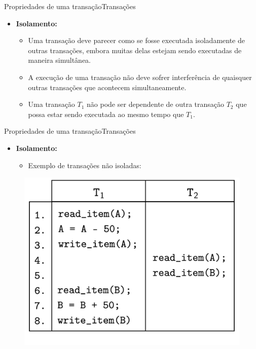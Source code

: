 \documentclass[t]{beamer}
\begin{document}

\begin{ftst}{Propriedades de uma transação}{Transações}

\begin{itemize}
    \item \textbf{Isolamento:} 
    \vone
    \begin{itemize}
        \item Uma transação deve parecer como se fosse executada isoladamente de outras transações, embora muitas delas estejam sendo executadas de maneira simultânea.
        \item A execução de uma transação não deve sofrer interferência de quaisquer outras transações que acontecem simultaneamente.
        \item Uma transação $T_1$ não pode ser dependente de outra transação $T_2$ que possa estar sendo executada ao mesmo tempo que $T_1$.
    \end{itemize}
\end{itemize}

\end{ftst}


\begin{ftst}{Propriedades de uma transação}{Transações}

\begin{itemize}
    \item \textbf{Isolamento:} 
    \vone
    \begin{itemize}
        \item Exemplo de transações não isoladas:
    \end{itemize}
\end{itemize}
    \begin{figure}
        \centering
        \includegraphics[scale=0.15]{Figuras_transacoes/5.png}
    \end{figure}

\end{ftst}
\end{document}
